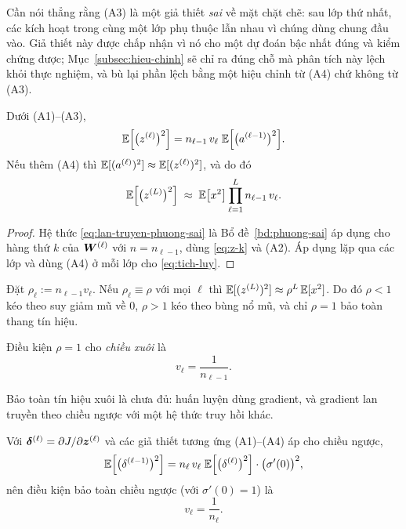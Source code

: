 Cần nói thẳng rằng (A3) là một giả thiết \emph{sai} về mặt chặt chẽ: sau lớp thứ
nhất, các kích hoạt trong cùng một lớp phụ thuộc lẫn nhau vì chúng dùng chung
đầu vào. Giả thiết này được chấp nhận vì nó cho một dự đoán bậc nhất đúng và
kiểm chứng được; Mục~\ref{subsec:hieu-chinh} sẽ chỉ ra đúng chỗ mà phân tích này
lệch khỏi thực nghiệm, và bù lại phần lệch bằng một hiệu chỉnh từ (A4) chứ không
từ (A3).
 
\begin{menhde}
\label{md:var-xuoi}
Dưới (A1)--(A3),
\begin{equation}
\mathbb{E}\Big[\big(z^{(\ell)}\big)^2\Big]
 = n_{\ell-1}\, v_\ell\; \mathbb{E}\Big[\big(a^{(\ell-1)}\big)^2\Big].
\label{eq:lan-truyen-phuong-sai}
\end{equation}
Nếu thêm (A4) thì $\mathbb{E}[(a^{(\ell)})^2] \approx \mathbb{E}[(z^{(\ell)})^2]$, và do đó
\begin{equation}
\mathbb{E}\Big[\big(z^{(L)}\big)^2\Big]
 \;\approx\; \mathbb{E}\big[x^2\big] \prod_{\ell=1}^{L} n_{\ell-1}\, v_\ell .
\label{eq:tich-luy}
\end{equation}
\end{menhde}
 
\begin{proof}
Hệ thức \eqref{eq:lan-truyen-phuong-sai} là Bổ đề~\ref{bd:phuong-sai} áp dụng
cho hàng thứ $k$ của $\bm{W}^{(\ell)}$ với $n = n_{\ell-1}$, dùng \eqref{eq:z-k} và
(A2). Áp dụng lặp qua các lớp và dùng (A4) ở mỗi lớp cho \eqref{eq:tich-luy}.
\end{proof}
 
\begin{hequa}
\label{hq:cap-so-nhan}
Đặt $\rho_\ell := n_{\ell-1} v_\ell$. Nếu $\rho_\ell \equiv \rho$ với mọi $\ell$
thì $\mathbb{E}[(z^{(L)})^2] \approx \rho^{L}\,\mathbb{E}[x^2]$. Do đó $\rho < 1$ kéo theo suy
giảm mũ về $0$, $\rho > 1$ kéo theo bùng nổ mũ, và chỉ $\rho = 1$ bảo toàn thang
tín hiệu.
\end{hequa}
 
Điều kiện $\rho = 1$ cho \emph{chiều xuôi} là
\begin{equation}
v_\ell = \frac{1}{n_{\ell-1}} .
\label{eq:dk-xuoi}
\end{equation}
 
Bảo toàn tín hiệu xuôi là chưa đủ: huấn luyện dùng gradient, và gradient lan
truyền theo chiều ngược với một hệ thức truy hồi khác.
 
\begin{menhde}
\label{md:var-nguoc}
Với $\bm{\delta}^{(\ell)} = \partial J/\partial\bm{z}^{(\ell)}$ và các giả thiết
tương ứng (A1)--(A4) áp cho chiều ngược,
\begin{equation}
\mathbb{E}\Big[\big(\delta^{(\ell-1)}\big)^2\Big]
 = n_{\ell}\, v_\ell\; \mathbb{E}\Big[\big(\delta^{(\ell)}\big)^2\Big]
   \cdot \big(\sigma'(0)\big)^2 ,
\label{eq:var-nguoc}
\end{equation}
nên điều kiện bảo toàn chiều ngược (với $\sigma'(0)=1$) là
\begin{equation}
v_\ell = \frac{1}{n_{\ell}} .
\label{eq:dk-nguoc}
\end{equation}
\end{menhde}
 
